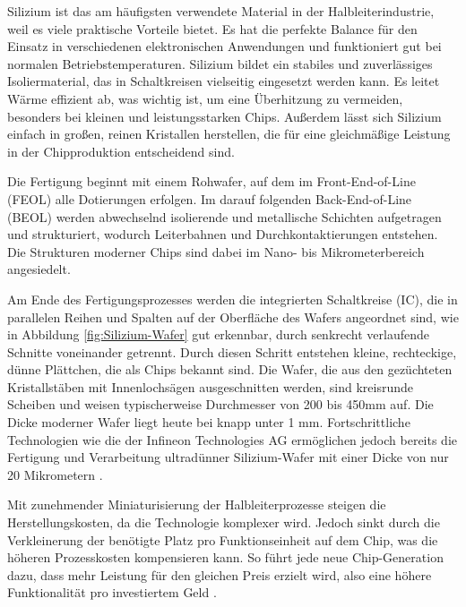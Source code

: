 Silizium ist das am häufigsten verwendete Material in der Halbleiterindustrie, weil es viele praktische Vorteile bietet. Es hat die perfekte Balance für den Einsatz in verschiedenen elektronischen Anwendungen und funktioniert gut bei normalen Betriebstemperaturen. Silizium bildet ein stabiles und zuverlässiges Isoliermaterial, das in Schaltkreisen vielseitig eingesetzt werden kann. Es leitet Wärme effizient ab, was wichtig ist, um eine Überhitzung zu vermeiden, besonders bei kleinen und leistungsstarken Chips. Außerdem lässt sich Silizium einfach in großen, reinen Kristallen herstellen, die für eine gleichmäßige Leistung in der Chipproduktion entscheidend sind.

Die Fertigung beginnt mit einem Rohwafer, auf dem im Front-End-of-Line (FEOL) alle Dotierungen erfolgen. Im darauf folgenden Back-End-of-Line (BEOL) werden abwechselnd isolierende und metallische Schichten aufgetragen und strukturiert, wodurch Leiterbahnen und Durchkontaktierungen entstehen. Die Strukturen moderner Chips sind dabei im Nano- bis Mikrometerbereich angesiedelt.

Am Ende des Fertigungsprozesses werden die integrierten Schaltkreise (\gls{IC}), die in parallelen Reihen und Spalten auf der Oberfläche des Wafers angeordnet sind, wie in Abbildung \ref{fig:Silizium-Wafer} gut erkennbar, durch senkrecht verlaufende Schnitte voneinander getrennt. Durch diesen Schritt entstehen kleine, rechteckige, dünne Plättchen, die als Chips bekannt sind. Die Wafer, die aus den gezüchteten Kristallstäben mit Innenlochsägen ausgeschnitten werden, sind kreisrunde Scheiben und weisen typischerweise Durchmesser von 200 bis 450mm auf. Die Dicke moderner Wafer liegt heute bei knapp unter 1 mm. Fortschrittliche Technologien wie die der Infineon Technologies AG ermöglichen jedoch bereits die Fertigung und Verarbeitung ultradünner Silizium-Wafer mit einer Dicke von nur 20 Mikrometern \cite{infineon2024dünnsterWafer}.

Mit zunehmender Miniaturisierung der Halbleiterprozesse steigen die Herstellungskosten, da die Technologie komplexer wird. Jedoch sinkt durch die Verkleinerung der benötigte Platz pro Funktionseinheit auf dem Chip, was die höheren Prozesskosten kompensieren kann. So führt jede neue Chip-Generation dazu, dass mehr Leistung für den gleichen Preis erzielt wird, also eine höhere Funktionalität pro investiertem Geld \cite{lienig2023halbleitertechnologie}.